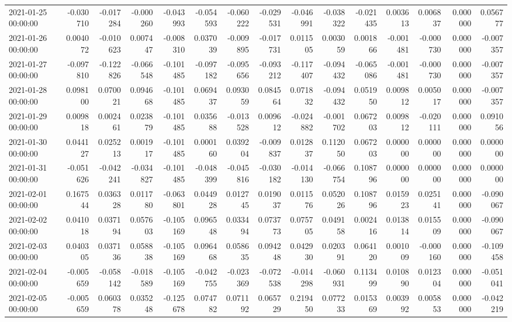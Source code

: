 \begin{tabular}{lrrrrrrrrrrrrrr}
2021-01-25 00:00:00 & -0.030710 & -0.017284 & -0.000260 & -0.043993 & -0.054593 & -0.060222 & -0.029531 & -0.046991 & -0.038322 & -0.021435 & 0.003613 & 0.006837 & 0.000000 & 0.056777 \\
2021-01-26 00:00:00 & 0.004072 & -0.010623 & 0.007447 & -0.008310 & 0.037039 & -0.009895 & -0.017731 & 0.011505 & 0.003059 & 0.001866 & -0.001481 & -0.000730 & 0.000000 & -0.007357 \\
2021-01-27 00:00:00 & -0.097810 & -0.122826 & -0.066548 & -0.101485 & -0.097182 & -0.095656 & -0.093212 & -0.117407 & -0.094432 & -0.065086 & -0.001481 & -0.000730 & 0.000000 & -0.007357 \\
2021-01-28 00:00:00 & 0.098100 & 0.070021 & 0.094668 & -0.101485 & 0.069437 & 0.093059 & 0.084564 & 0.071832 & -0.094432 & 0.051950 & 0.009812 & 0.005017 & 0.000000 & -0.007357 \\
2021-01-29 00:00:00 & 0.009818 & 0.002461 & 0.023879 & -0.101485 & 0.035688 & -0.013528 & 0.009612 & -0.024882 & -0.001702 & 0.067203 & 0.009812 & -0.020111 & 0.000000 & 0.091056 \\
2021-01-30 00:00:00 & 0.044127 & 0.025213 & 0.001917 & -0.101485 & 0.000160 & 0.039204 & -0.009837 & 0.012837 & 0.112050 & 0.067203 & 0.000000 & 0.000000 & 0.000000 & 0.000000 \\
2021-01-31 00:00:00 & -0.051626 & -0.042241 & -0.034827 & -0.101485 & -0.048399 & -0.045816 & -0.030182 & -0.014130 & -0.066754 & 0.108796 & 0.000000 & 0.000000 & 0.000000 & 0.000000 \\
2021-02-01 00:00:00 & 0.167544 & 0.036328 & 0.011780 & -0.063801 & 0.044928 & 0.012745 & 0.019037 & 0.011576 & 0.052026 & 0.108796 & 0.015923 & 0.025141 & 0.000000 & -0.090067 \\
2021-02-02 00:00:00 & 0.041018 & 0.037194 & 0.057603 & -0.105169 & 0.096548 & 0.033494 & 0.073773 & 0.075705 & 0.049158 & 0.002416 & 0.013814 & 0.015509 & 0.000000 & -0.090067 \\
2021-02-03 00:00:00 & 0.040305 & 0.037136 & 0.058838 & -0.105169 & 0.096468 & 0.058635 & 0.094248 & 0.042930 & 0.020391 & 0.064120 & 0.001009 & -0.000160 & 0.000000 & -0.109458 \\
2021-02-04 00:00:00 & -0.005659 & -0.058142 & -0.018589 & -0.105169 & -0.042755 & -0.023369 & -0.072538 & -0.014298 & -0.060931 & 0.113499 & 0.010890 & 0.012304 & 0.000000 & -0.051041 \\
2021-02-05 00:00:00 & -0.005659 & 0.060378 & 0.035248 & -0.125678 & 0.074782 & 0.071192 & 0.065729 & 0.219450 & 0.077233 & 0.015369 & 0.003992 & 0.005853 & 0.000000 & -0.042219 \\

\end{tabular}
